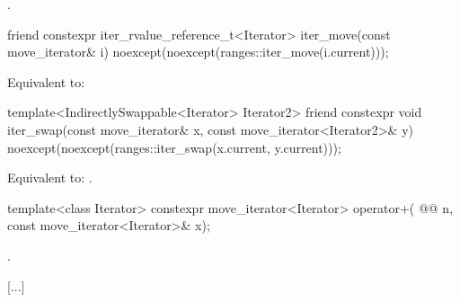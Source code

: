 \begin{itemdescr}
\pnum
\returns {}.
\end{itemdescr}

{\color{newclr}
%
\begin{itemdecl}
friend constexpr iter_rvalue_reference_t<Iterator> iter_move(const move_iterator& i)
  noexcept(noexcept(ranges::iter_move(i.current)));
\end{itemdecl}

\begin{itemdescr}
\pnum
\effects Equivalent to: 
\end{itemdescr}

%
\begin{itemdecl}
template<IndirectlySwappable<Iterator> Iterator2>
  friend constexpr void iter_swap(const move_iterator& x, const move_iterator<Iterator2>& y)
    noexcept(noexcept(ranges::iter_swap(x.current, y.current)));
\end{itemdecl}

\begin{itemdescr}
\pnum
\effects Equivalent to: .
\end{itemdescr}
} %

%
\begin{itemdecl}
template<class Iterator>
  constexpr move_iterator<Iterator> operator+(
    @@ n,
    const move_iterator<Iterator>& x);
\end{itemdecl}

\begin{itemdescr}
\pnum
\returns {}.
\end{itemdescr}

[...]


